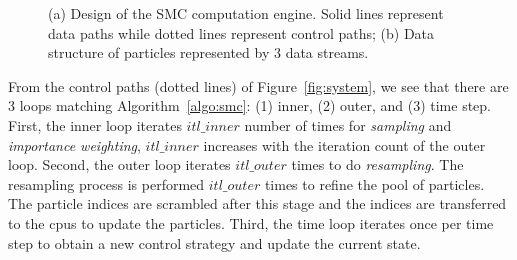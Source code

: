 \setcounter{subfigure}{0}
\begin{figure}[t!]
\centering
{}
\caption{(a) Design of the SMC computation engine. Solid lines represent data paths while dotted lines represent control paths; (b) Data structure of particles represented by 3 data streams.}
\end{figure}

From the control paths (dotted lines) of Figure~\ref{fig:system}, we see that there are 3 loops matching Algorithm~\ref{algo:smc}: 
(1) inner, (2) outer, and (3) time step.
First, the inner loop iterates $itl\_inner$ number of times for \textit{sampling} and \textit{importance weighting},
$itl\_inner$ increases with the iteration count of the outer loop.
Second, the outer loop iterates $itl\_outer$ times to do \textit{resampling}.
The resampling process is performed $itl\_outer$ times to refine the pool of particles.
The particle indices are scrambled after this stage and the indices are transferred to the \glspl{cpu} to update the particles.
Third, the time loop iterates once per time step to obtain a new control strategy and update the current state.

